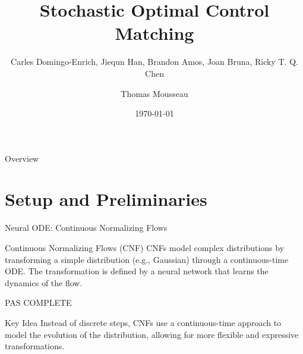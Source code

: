 \documentclass[aspectratio=169,xcolor=dvipsnames]{beamer}
\title{Stochastic Optimal Control Matching}
\subtitle{Carles Domingo-Enrich, Jiequn Han, Brandon Amos, Joan Bruna, Ricky T. Q. Chen}
\author{Thomas Mousseau}
\date{\today} %
\begin{document}
\begin{frame}
    \titlepage
\end{frame}

\begin{frame}{Overview}
    \tableofcontents
\end{frame}

\section{Setup and Preliminaries}

\begin{frame}{Neural ODE: Continuous Normalizing Flows}

    \begin{block}{Continuous Normalizing Flows (CNF)}
        CNFs model complex distributions by transforming a simple distribution (e.g., Gaussian) through a continuous-time ODE. The transformation is defined by a neural network that learns the dynamics of the flow.
    \end{block}

    PAS COMPLETE
    
    \vspace{0.3cm}
    
    \begin{alertblock}{Key Idea}
        Instead of discrete steps, CNFs use a continuous-time approach to model the evolution of the distribution, allowing for more flexible and expressive transformations.
    \end{alertblock}
\end{frame}
\end{document}
